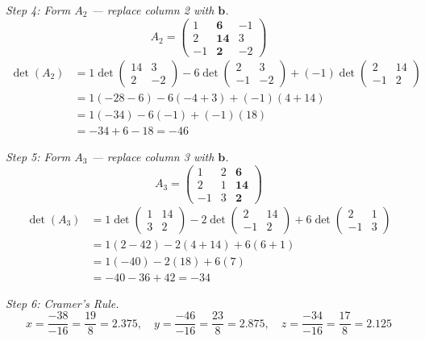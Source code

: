 \documentclass[12pt,a4paper]{article}
\begin{document}
\textit{Step 4: Form \(A_2\) --- replace column 2 with \(\mathbf{b}\).}
\[
A_2 = \begin{pmatrix}1&\mathbf{6}&-1\\2&\mathbf{14}&3\\-1&\mathbf{2}&-2\end{pmatrix}
\]
\begin{align*}
\det(A_2) &= 1\det\begin{pmatrix}14&3\\2&-2\end{pmatrix}
            - 6\det\begin{pmatrix}2&3\\-1&-2\end{pmatrix}
            + (-1)\det\begin{pmatrix}2&14\\-1&2\end{pmatrix} \\
&= 1(-28-6) - 6(-4+3) + (-1)(4+14) \\
&= 1(-34) - 6(-1) + (-1)(18) \\
&= -34 + 6 - 18 = -46
\end{align*}

\textit{Step 5: Form \(A_3\) --- replace column 3 with \(\mathbf{b}\).}
\[
A_3 = \begin{pmatrix}1&2&\mathbf{6}\\2&1&\mathbf{14}\\-1&3&\mathbf{2}\end{pmatrix}
\]
\begin{align*}
\det(A_3) &= 1\det\begin{pmatrix}1&14\\3&2\end{pmatrix}
            - 2\det\begin{pmatrix}2&14\\-1&2\end{pmatrix}
            + 6\det\begin{pmatrix}2&1\\-1&3\end{pmatrix} \\
&= 1(2-42) - 2(4+14) + 6(6+1) \\
&= 1(-40) - 2(18) + 6(7) \\
&= -40 - 36 + 42 = -34
\end{align*}

\textit{Step 6: Cramer's Rule.}
\[
x = \frac{-38}{-16} = \frac{19}{8} = 2.375, \quad
y = \frac{-46}{-16} = \frac{23}{8} = 2.875, \quad
z = \frac{-34}{-16} = \frac{17}{8} = 2.125
\]
\end{document}
